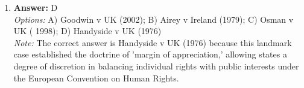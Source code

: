 \documentclass[12pt]{article}
\begin{document}
\begin{enumerate}[label=\arabic*.]
\\ \textit{Note:} The correct answer identifies the key attributes of law as defined by legal philosopher John Austin, who emphasized that law is a command issued by a sovereign authority and backed by the threat of sanction for non-compliance.
\item \textbf{Answer:} D
\\ \textit{Options:} A) Goodwin v UK (2002); B) Airey v Ireland (1979); C) Osman v UK ( 1998); D) Handyside v UK (1976)
\\ \textit{Note:} The correct answer is Handyside v UK (1976) because this landmark case established the doctrine of 'margin of appreciation,' allowing states a degree of discretion in balancing individual rights with public interests under the European Convention on Human Rights.
\end{enumerate}
\end{document}
